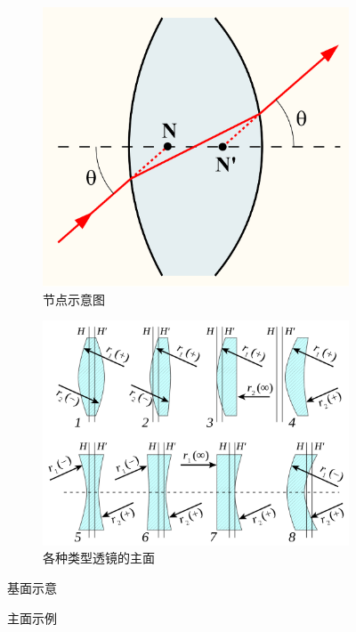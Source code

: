 \documentclass{ctexart}
\begin{document}
\begin{figure}[htbp]
\begin{subfigure}{.4\textwidth}
        \includegraphics[width=\linewidth]{src/NodalPoints.png}
        \caption{节点示意图}
        \label{fig:节点示意图}
    \end{subfigure}
    \begin{subfigure}{.9\textwidth}
        \centering
        \includegraphics[width=\linewidth]{src/PrinciplePlanes.png}
        \caption{各种类型透镜的主面}
        \label{fig:各种类型透镜的主面}
    \end{subfigure}
    \caption{基面示意}
\end{figure}
\begin{figure}
    \centering
    \caption{主面示例}
    \label{fig:主面示例}
\end{figure}
\end{document}
